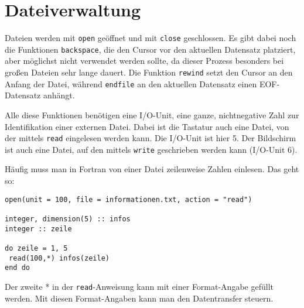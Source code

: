 \section{Dateiverwaltung}

Dateien werden mit \texttt{open} geöffnet und mit \texttt{close} geschlossen. Es gibt dabei noch die Funktionen \texttt{backspace}, die den Cursor vor den aktuellen Datensatz platziert, aber möglichst nicht verwendet werden sollte, da dieser Prozess besonders bei großen Dateien sehr lange dauert. Die Funktion \texttt{rewind} setzt den Cursor an den Anfang der Datei, während \texttt{endfile} an den aktuellen Datensatz einen EOF-Datensatz anhängt.

Alle diese Funktionen benötigen eine I/O-Unit, eine ganze, nichtnegative Zahl zur Identifikation einer externen Datei. Dabei ist die Tastatur auch eine Datei, von der mittels \texttt{read} eingelesen werden kann. Die I/O-Unit ist hier 5. Der Bildschirm ist auch eine Datei, auf den mittels \texttt{write} geschrieben werden kann (I/O-Unit 6).

Häufig muss man in Fortran von einer Datei zeilenweise Zahlen einlesen. Das geht so:
\begin{lstlisting}
open(unit = 100, file = informationen.txt, action = "read") 

integer, dimension(5) :: infos
integer :: zeile

do zeile = 1, 5
 read(100,*) infos(zeile)
end do
\end{lstlisting}

Der zweite * in der \texttt{read}-Anweisung kann mit einer Format-Angabe gefüllt werden. Mit diesen Format-Angaben kann man den Datentransfer steuern.